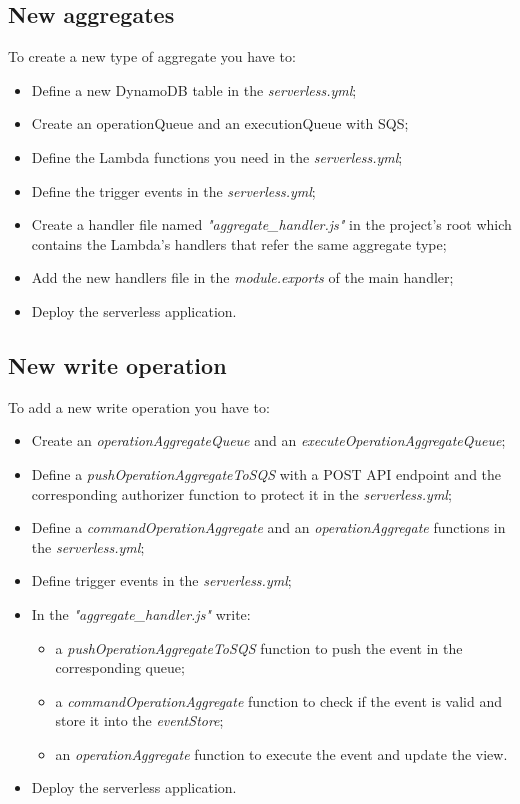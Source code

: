 \newpage
{}
\subsection{New aggregates}
To create a new type of aggregate you have to:
\begin{itemize}
	\item Define a new DynamoDB table in the \emph{serverless.yml};
	\item Create an operationQueue and an executionQueue with SQS;
	\item Define the Lambda functions you need in the \emph{serverless.yml};
	\item Define the trigger events in the \emph{serverless.yml};
	\item Create a handler file named \emph{"aggregate\_handler.js"} in the project's root which contains the Lambda's handlers that refer the same aggregate type;
	\item Add the new handlers file in the \emph{module.exports} of the main handler;
	\item Deploy the serverless application.
\end{itemize}

\subsection{New write operation}
To add a new write operation you have to:
\begin{itemize}
	\item Create an \emph{operationAggregateQueue} and an \emph{executeOperationAggregateQueue}; 
	\item Define a \emph{pushOperationAggregateToSQS} with a POST API endpoint and the corresponding authorizer function to protect it in the \emph{serverless.yml};
	\item Define a \emph{commandOperationAggregate} and an \emph{operationAggregate} functions in the \emph{serverless.yml};
	\item Define trigger events in the \emph{serverless.yml};
	\item In the \emph{"aggregate\_handler.js"} write:
	\begin{itemize}
		\item a \emph{pushOperationAggregateToSQS} function to push the event in the corresponding queue;
		\item a \emph{commandOperationAggregate} function to check if the event is valid and store it into the \emph{eventStore};
		\item an \emph{operationAggregate} function to execute the event and update the view.
	\end{itemize}
	\item Deploy the serverless application.
\end{itemize}

